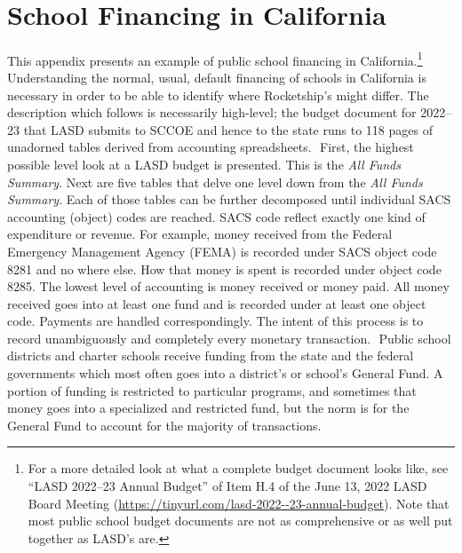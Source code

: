     ﻿
\chapter{School Financing in California}\label{appx:ca-school-financing}\noindent%
    This appendix presents an example of public school financing in California.\footnote{For a more detailed look at what a complete budget document looks like, see ``LASD 2022–23 Annual Budget'' of Item H.4 of the June 13, 2022 LASD Board Meeting (\url{https://tinyurl.com/lasd-2022--23-annual-budget}). Note that most public school budget documents are not as comprehensive or as well put together as LASD's are.} %
    Understanding the normal, usual, default financing of schools in California is necessary in order to be able to identify where Rocketship's might differ. The description which follows is necessarily high-level; the budget document for 2022–23 that LASD submits to SCCOE and hence to the state runs to 118 pages of unadorned tables derived from accounting spreadsheets.
    ﻿
    First, the highest possible level look at a LASD budget is presented. This is the \textit{All Funds Summary}. Next are five tables that delve one level down from the \textit{All Funds Summary}. Each of those tables can be further decomposed until individual SACS accounting (object) codes are reached. SACS code reflect exactly one kind of expenditure or revenue. For example, money received from the Federal Emergency Management Agency (FEMA) is recorded under SACS object code 8281 and no where else. How that money is spent is recorded under object code 8285. The lowest level of accounting is money received or money paid. All money received goes into at least one fund and is recorded under at least one object code. Payments are handled correspondingly. The intent of this process is to record unambiguously and completely every monetary transaction. 
    ﻿
    Public school districts and charter schools receive funding from the state and the federal governments which most often goes into a district's or school's General Fund. A portion of funding is restricted to particular programs, and sometimes that money goes into a specialized and restricted fund, but the norm is for the General Fund to account for the majority of transactions.
    ﻿
